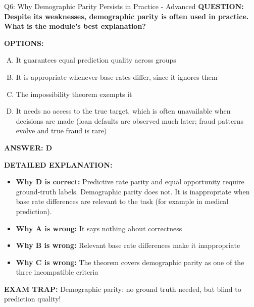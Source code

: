 \documentclass[8pt]{beamer}
\begin{document}
\begin{frame}[shrink=6]{Q6: Why Demographic Parity Persists in Practice - Advanced}
\fontsize{6.5}{7.5}\selectfont
\textbf{QUESTION: Despite its weaknesses, demographic parity is often used in practice. What is the module's best explanation?}

\vspace{0.1cm}
\textbf{OPTIONS:}
\begin{enumerate}[A.]
\item It guarantees equal prediction quality across groups
\item It is appropriate whenever base rates differ, since it ignores them
\item The impossibility theorem exempts it
\item It needs no access to the true target, which is often unavailable when decisions are made (loan defaults are observed much later; fraud patterns evolve and true fraud is rare)
\end{enumerate}

\vspace{0.1cm}
\textcolor{myblue}{\textbf{ANSWER: D}}

\vspace{0.1cm}
\textbf{DETAILED EXPLANATION:}
\begin{itemize}
\item \textbf{Why D is correct:} Predictive rate parity and equal opportunity require ground-truth labels. Demographic parity does not. It is inappropriate when base rate differences are relevant to the task (for example in medical prediction).
\item \textbf{Why A is wrong:} It says nothing about correctness
\item \textbf{Why B is wrong:} Relevant base rate differences make it inappropriate
\item \textbf{Why C is wrong:} The theorem covers demographic parity as one of the three incompatible criteria
\end{itemize}

\textcolor{myred}{\textbf{EXAM TRAP:}} Demographic parity: no ground truth needed, but blind to prediction quality!
\end{frame}
\end{document}
